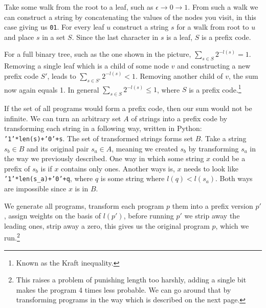 Take some walk from the root to a leaf, such as $\epsilon \rightarrow 0 \rightarrow 1$.
From such a walk we can construct a string by concatenating the values of the nodes you visit, in this case giving us \texttt{01}.
For every leaf $u$ construct a string $s$ for a walk from root to $u$ and place $s$ in a set $S$.
Since the last character in $s$ is a leaf, $S$ is a prefix code.

For a full binary tree, such as the one shown in the picture, $\sum_{s \in S} 2^{-l(s)} = 1$.
Removing a single leaf which is a child of some node $v$ and constructing a new prefix code $S'$, leads to $\sum_{s \in S'} 2^{-l(s)} < 1$.
Removing another child of $v$, the sum now again equals 1.
In general $\sum_{s \in S} 2^{-l(s)} \leq 1$, where $S$ is a prefix code.\footnote{Known as the Kraft inequality.}

If the set of all programs would form a prefix code, then our sum would not be infinite. 
We can turn an arbitrary set $A$ of strings into a prefix code by transforming each string in a following way, written in Python: \texttt{'1'*len(s)+'0'+s}. 
The set of transformed strings forms set $B$. 
Take a string $s_b \in B$ and its original pair $s_a \in A$, meaning we created $s_b$ by transforming $s_a$ in the way we previously described. 
One way in which some string $x$ could be a prefix of $s_b$ is if $x$ contains only ones. 
Another ways is, $x$ needs to look like \texttt{'1'*len(s\_a)+'0'+q}, where $q$ is some string where $l(q) < l(s_a)$.
Both ways are impossible since $x$ is in $B$.

We generate all programs, transform each program $p$ them into a prefix version $p'$, assign weights on the basis of $l(p')$, before running $p'$ we strip away the leading ones, strip away a zero, this gives us the original program $p$, which we run.\footnote{
This raises a problem of punishing length too harshly, adding a single bit makes the program 4 times less probable.
We can go around that by transforming programs in the way which is described on the next page.
}

\newpage

